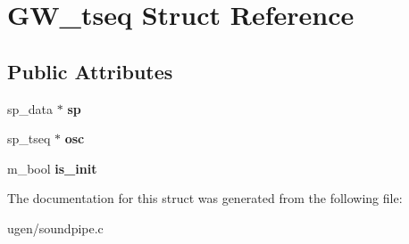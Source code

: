 \hypertarget{structGW__tseq}{}\section{G\+W\+\_\+tseq Struct Reference}
\label{structGW__tseq}
\subsection*{Public Attributes}
\begin{DoxyCompactItemize}
\item 
\hypertarget{structGW__tseq_ab49414a3b293779a6ba56b29f6421087}{}\label{structGW__tseq_ab49414a3b293779a6ba56b29f6421087} 
sp\+\_\+data $\ast$ {\bfseries sp}
\item 
\hypertarget{structGW__tseq_a20f250f7667852ec818f04fc66aadd40}{}\label{structGW__tseq_a20f250f7667852ec818f04fc66aadd40} 
sp\+\_\+tseq $\ast$ {\bfseries osc}
\item 
\hypertarget{structGW__tseq_ac1cdbd85482ace19efbe7828345fceff}{}\label{structGW__tseq_ac1cdbd85482ace19efbe7828345fceff} 
m\+\_\+bool {\bfseries is\+\_\+init}
\end{DoxyCompactItemize}


The documentation for this struct was generated from the following file\+:\begin{DoxyCompactItemize}
\item 
ugen/soundpipe.\+c\end{DoxyCompactItemize}
